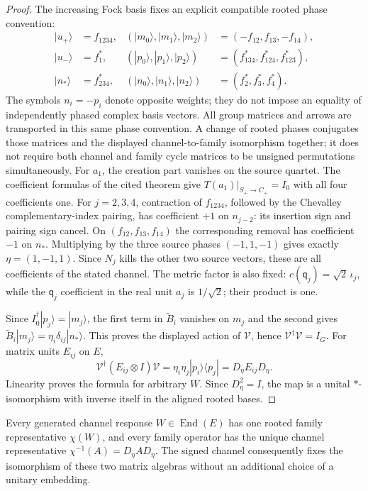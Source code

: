 \documentclass[11pt]{article}
\begin{document}
\begin{proof}
The increasing Fock basis fixes an explicit compatible rooted phase
convention:
\[
\begin{aligned}
 |u_+\rangle&=f_{1234},&
 (|m_0\rangle,|m_1\rangle,|m_2\rangle)
 &=(-f_{12},f_{13},-f_{14}),\\
 |u_-\rangle&=f_1^*,&
 (|p_0\rangle,|p_1\rangle,|p_2\rangle)
 &=(f_{134}^*,f_{124}^*,f_{123}^*),\\
 |n_*\rangle&=f_{234}^*,&
 (|n_0\rangle,|n_1\rangle,|n_2\rangle)
 &=(f_2^*,f_3^*,f_4^*).
\end{aligned}
\]
The symbols \(n_i=-p_i\) denote opposite weights; they do not impose
an equality of independently phased complex basis vectors.
All group matrices and arrows are transported in this same phase
convention. A change of rooted phases conjugates those matrices and the
displayed channel-to-family isomorphism together; it does not require
both channel and family cycle matrices to be unsigned permutations
simultaneously.
For \(a_1\), the creation part vanishes on the source quartet.
The coefficient formulas of the cited theorem give
\(T(a_1)|_{S_+\to C_+}=I_0\) with all four coefficients one.
For \(j=2,3,4\), contraction of \(f_{1234}\), followed by the
Chevalley complementary-index pairing, has coefficient \(+1\)
on \(n_{j-2}\): its insertion sign and pairing sign cancel.
On \((f_{12},f_{13},f_{14})\) the corresponding removal has
coefficient \(-1\) on \(n_*\). Multiplying by the three source
phases \((-1,1,-1)\) gives exactly \(\eta=(1,-1,1)\).
Since \(N_j\) kills the other two source vectors, these are all
coefficients of the stated channel. The metric factor is also fixed:
\(c(\mathsf q_j)=\sqrt2\,\iota_j\), while the \(\mathsf q_j\) coefficient in the
real unit \(a_j\) is \(1/\sqrt2\); their product is one.

Since $I_0^\dagger|p_j\rangle=|m_j\rangle$, the first term in
$\widetilde B_i$ vanishes on $m_j$ and the second gives
$\widetilde B_i|m_j\rangle=\eta_i\delta_{ij}|n_*\rangle$.
This proves the displayed action of $\mathcal V$, hence
$\mathcal V^\dagger\mathcal V=I_G$.  For matrix units $E_{ij}$ on $E$,
\[
 \mathcal V^\dagger(E_{ij}\otimes I)\mathcal V
 =\eta_i\eta_j|p_i\rangle\langle p_j|
 =D_\eta E_{ij}D_\eta.
\]
Linearity proves the formula for arbitrary $W$.  Since $D_\eta^2=I$, the map
is a unital $*$-isomorphism with inverse itself in the aligned rooted bases.
\end{proof}

\begin{corollary}
\label{p1:cor:v567-no-independent-channel-family-map}
Every generated channel response $W\in\operatorname{End}(E)$ has one rooted
family representative $\chi(W)$, and every family operator has the unique
channel representative $\chi^{-1}(A)=D_\eta A D_\eta$.
The signed channel consequently fixes the isomorphism of these two
matrix algebras without an additional choice of a unitary embedding.
\end{corollary}
\end{document}
